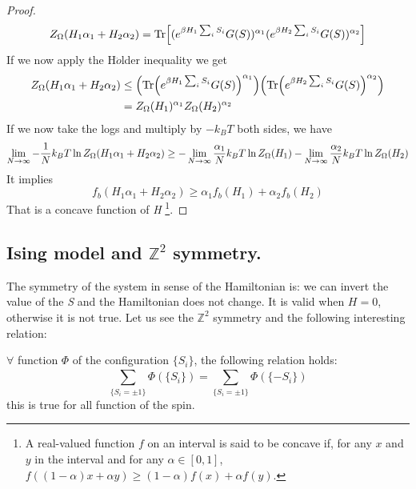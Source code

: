 \documentclass[../main/main.tex]{subfiles}
\begin{document}
\begin{proof}
\begin{equation*}
    Z_ \Omega  (H_1 \alpha _1 + H_2 \alpha _2)   = \Tr[ (e^{\beta H_1 \sum_{i}^{} S_i } G (S))^{\alpha _1} (e^{\beta H_2 \sum_{i}^{} S_i } G (S))^{\alpha _2}]
\end{equation*}
If we now apply the H$\ddot{o}$lder inequality we get
\begin{equation*}
\begin{split}
    Z_ \Omega  (H_1 \alpha _1 + H_2 \alpha _2) & \le \qty(\Tr (e^{\beta H_1 \sum_{i}^{} S_i } G(S))^{\alpha _1}  ) \qty(\Tr (e^{\beta H_2 \sum_{i}^{} S_i } G (S))^{\alpha _2}  ) \\
    & = Z_ \Omega (H_1)^{\alpha _1} Z_ \Omega (H_2)^{\alpha _2}
\end{split}
\end{equation*}
If we now take the logs and multiply by \( -k_B T \) both sides, we have
\begin{equation*}
  \lim_{N \rightarrow \infty } - \frac{1}{N} k_B T \ln{Z_ \Omega (H_1 \alpha _1 + H_2 \alpha _2)}  \ge
   - \lim_{N \rightarrow \infty } \frac{\alpha _1}{N} k_B T \ln{Z_ \Omega  (H_1 )} -
    \lim_{N \rightarrow \infty } \frac{\alpha _2}{N} k_B T \ln{Z_ \Omega  (H_2 )}  \\
\end{equation*}
It implies
\begin{equation*}
  f_b (H_1 \alpha _1 + H_2 \alpha _2) \ge \alpha _1 f_b (H_1 ) +  \alpha _2 f_b (H_2)
\end{equation*}
That is a concave function of \emph{H} \footnote{A real-valued function \(f \) on an interval is said to be concave if, for any \(x \) and \( y \) in the interval and for any \( \alpha \in [0,1] \),
\(  f( (1-\alpha ) x + \alpha y ) \geq (1-\alpha ) f(x) + \alpha f(y) \).}.
\end{proof}

\subsection{Ising model and \( \mathbb{Z}^2 \) symmetry. }
The symmetry of the system in sense of the Hamiltonian is: we can invert the value of the \emph{S} and the Hamiltonian does not change. It is valid when \( H=0 \), otherwise it is not true. Let us see the \( \mathbb{Z}^2 \) symmetry and the following interesting relation:

  \begin{lemma}{}{}
  \( \forall  \) function \( \Phi  \) of the configuration \( \{ S_i \}   \), the following relation holds:
  \begin{equation}
    \sum_{ \{S_i = \pm 1\}}^{}  \Phi  (\{S_i\} ) =   \sum_{ \{S_i = \pm 1\}}^{}  \Phi  (\{-S_i\} )
      \label{eq:6_1}
  \end{equation}
  this is true for all function of the spin.
  \end{lemma}
\end{document}
